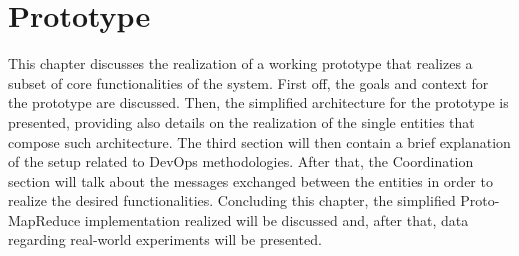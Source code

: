 \chapter{Prototype}
This chapter discusses the realization of a working prototype that realizes a subset of core functionalities of the system. First off, the goals and context for the prototype are discussed. Then, the simplified architecture for the prototype is presented, providing also details on the realization of the single entities that compose such architecture. The third section will then contain a brief explanation of the setup related to DevOps methodologies. After that, the Coordination section will talk about the messages exchanged between the entities in order to realize the desired functionalities. Concluding this chapter, the simplified Proto-MapReduce implementation realized will be discussed and, after that, data regarding real-world experiments will be presented. 






